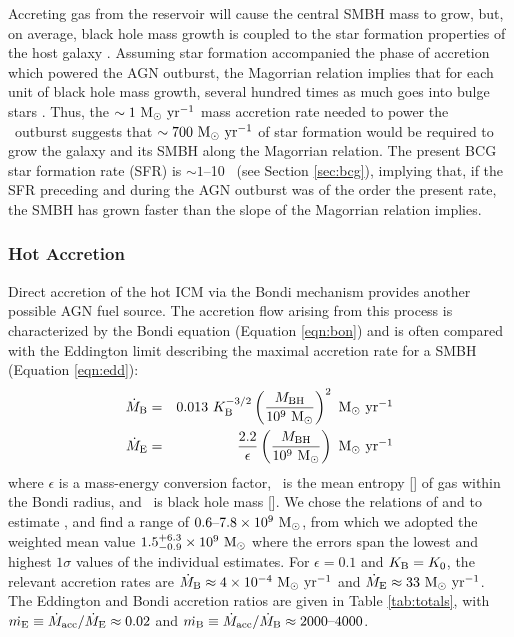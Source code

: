 \documentclass[iop]{emulateapj}
\begin{document}
Accreting gas from the reservoir will cause the central SMBH mass to
grow, but, on average, black hole mass growth is coupled to the star
formation properties of the host galaxy
\citep[\eg][]{1995ARA&A..33..581K, 2000ApJ...539L...9F}. Assuming star
formation accompanied the phase of accretion which powered the AGN
outburst, the Magorrian relation \citep{magorrian} implies that for
each unit of black hole mass growth, several hundred times as much
goes into bulge stars \citep[\eg][]{2004ApJ...604L..89H}. Thus, the
$\sim 1 ~\mbox{\ensuremath{\rm{M_{\odot}}~\rm{\mbox{\ensuremath{\rm{yr}}}^{-1}}}}$ mass accretion rate needed to power the
\rbs\ outburst suggests that $\sim 700 ~\mbox{\ensuremath{\rm{M_{\odot}}~\rm{\mbox{\ensuremath{\rm{yr}}}^{-1}}}}$ of star formation
would be required to grow the galaxy and its SMBH along the Magorrian
relation. The present BCG star formation rate (SFR) is $\sim 1$--10
\msolpy\ (see Section \ref{sec:bcg}), implying that, if the SFR
preceding and during the AGN outburst was of the order the present
rate, the SMBH has grown faster than the slope of the Magorrian
relation implies.

\subsubsection{Hot Accretion}

Direct accretion of the hot ICM via the Bondi mechanism provides
another possible AGN fuel source. The accretion flow arising from this
process is characterized by the Bondi equation (Equation
\ref{eqn:bon}) and is often compared with the Eddington limit
describing the maximal accretion rate for a SMBH (Equation
\ref{eqn:edd}):
\begin{eqnarray}
  \dot{M}_{\rm{B}} &=& 0.013 ~K_{\rm{B}}^{-3/2} \left(\frac{M_{\rm{BH}}}{10^9
    ~\rm{M_{\odot}}}\right)^{2} ~\mbox{\ensuremath{\rm{M_{\odot}}~\rm{\mbox{\ensuremath{\rm{yr}}}^{-1}}}} \label{eqn:bon}\\
  \dot{M}_{\rm{E}} &=& \frac{2.2}{\epsilon} \left(\frac{M_{\rm{BH}}}{10^9~\rm{M_{\odot}}}\right)
  ~\mbox{\ensuremath{\rm{M_{\odot}}~\rm{\mbox{\ensuremath{\rm{yr}}}^{-1}}}}  \label{eqn:edd}
\end{eqnarray}
where $\epsilon$ is a mass-energy conversion factor, \kbon\ is the
mean entropy [\ent] of gas within the Bondi radius, and \mbh\ is black
hole mass [\msol]. We chose the relations of
\citet{2002ApJ...574..740T} and \citet{2007MNRAS.379..711G} to
estimate \mbh, and find a range of $0.6 \mbox{--} 7.8 \times 10^9 ~\rm{M_{\odot}}$,
from which we adopted the weighted mean value $1.5^{+6.3}_{-0.9}
\times 10^9 ~\rm{M_{\odot}}$ where the errors span the lowest and highest
$1\sigma$ values of the individual estimates. For $\epsilon = 0.1$ and
$K_{\rm{B}} = K_0$, the relevant accretion rates are $\dot{M}_{\rm{B}} \approx 4
\times 10^{-4} ~\mbox{\ensuremath{\rm{M_{\odot}}~\rm{\mbox{\ensuremath{\rm{yr}}}^{-1}}}}$ and $\dot{M}_{\rm{E}} \approx 33 ~\mbox{\ensuremath{\rm{M_{\odot}}~\rm{\mbox{\ensuremath{\rm{yr}}}^{-1}}}}$. The
Eddington and Bondi accretion ratios are given in Table
\ref{tab:totals}, with $\dot{m_{\rm{E}}} \equiv \dot{M}_{\rm{acc}}/\dot{M}_{\rm{E}} \approx 0.02$ and
$\dot{m_{\rm{B}}} \equiv \dot{M}_{\rm{acc}}/\dot{M}_{\rm{B}} \approx 2000 \mbox{--} 4000$.
\end{document}
